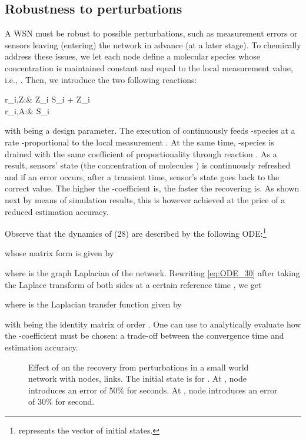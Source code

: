 \documentclass[journal]{IEEEtran}
\newcommand{\mol}[1]{\ensuremath{\textrm{#1}}}
\begin{document}
\subsection{Robustness to perturbations}
{A WSN must be robust to possible perturbations, such as measurement errors or sensors leaving (entering) the network in advance (at a later stage). To chemically address these issues, we let each node define a molecular species  whose concentration is maintained constant and equal to the local measurement value, i.e., . Then, we introduce the two following reactions:
 
		\label{eq:errIn}
	    	 r_{i,Z}:\quad&	 \mol{Z}_i \stackrel{\delta}{\longrightarrow} 	\mol{S}_i + \mol{Z}_i	\\
		 \label{eq:errDrain}
		 r_{i,A}:\quad &  \mol{S}_i \stackrel{\delta}{\longrightarrow} 	\emptyset 
  
with  being a design parameter. The execution of  continuously feeds -species at a rate -proportional to the local measurement . At the same time, -species is drained with the same coefficient  of proportionality through reaction . As a result, sensors' state (the concentration of molecules ) is continuously refreshed and if an error occurs, after a transient time, sensor's state goes back to the correct value. The higher the -coefficient is, the faster the recovering is. As shown next by means of simulation results, this is however achieved at the price of a reduced estimation accuracy. 


{Observe that the dynamics of (28)} are described by the following ODE:\footnote{{ represents the vector of initial states.}}

whose matrix form is given by

where  is the graph Laplacian of the network. Rewriting \eqref{eq:ODE_30} after taking the Laplace transform of both sides at a certain reference time , we get

where  is the Laplacian transfer function given by

with  being the identity matrix of order . One can use  to analytically evaluate how the -coefficient must be chosen: a trade-off between the convergence time and estimation accuracy.









}


\begin{figure}[t]
 \centering
\caption{{Effect of  on the recovery from perturbations in a small world network with  nodes,  links. The initial state is  for . At , node  introduces an error of 50\% for  seconds. At , node  introduces an error of 30\% for  second.}}
\label{fig:errFast}
\end{figure}
\end{document}
